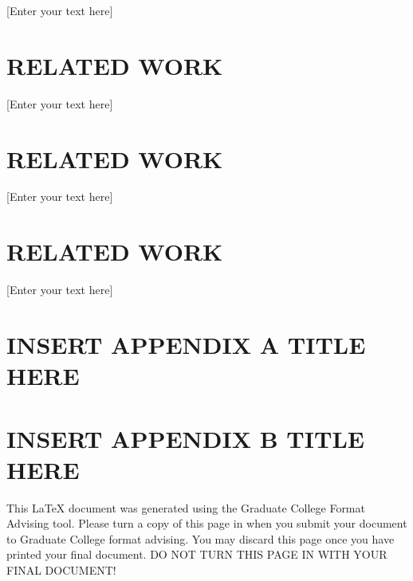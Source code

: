 \documentclass[oneside,11pt]{memoir}
\begin{document}
\DoubleSpacing
\setlength{\parindent}{.5in}
[Enter your text here]

\clearpage




\chapter{RELATED WORK} 

\DoubleSpacing
\setlength{\parindent}{.5in}
[Enter your text here]

\clearpage




\chapter{RELATED WORK} 

\DoubleSpacing
\setlength{\parindent}{.5in}
[Enter your text here]

\clearpage



\chapter{RELATED WORK} 

\DoubleSpacing
\setlength{\parindent}{.5in}
[Enter your text here]

\clearpage

\vspace*{0.23in}
\begin{SingleSpace}
	

\end{SingleSpace}
 

\appendix
{}
\chapter{\uppercase{Insert Appendix A Title here}}
\clearpage
\chapter{\uppercase{Insert Appendix B Title here}}
\clearpage

This LaTeX document was generated using the Graduate College Format Advising tool. Please turn a copy of this page in when you submit your document to Graduate College format advising. You may discard this page once you have printed your final document. DO NOT TURN THIS PAGE IN WITH YOUR FINAL DOCUMENT! 
\end{document}

